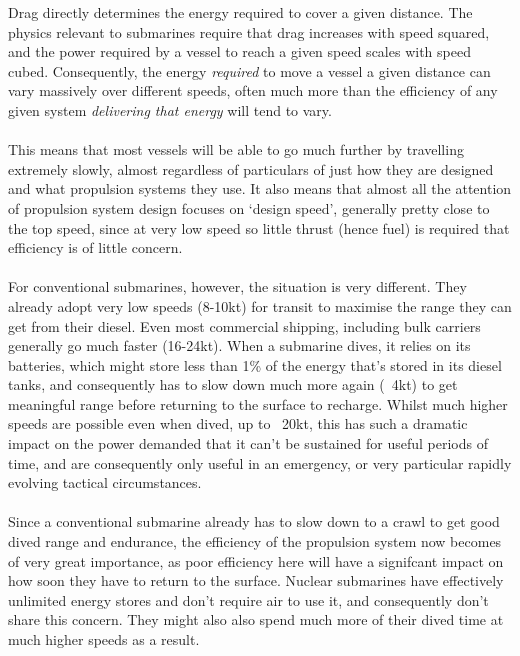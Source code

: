 \documentclass{article}\usepackage[]{graphicx}\usepackage[]{color}
\begin{document}
\begin{tcolorbox}[width=0.8\textwidth, center, colback=blue!5!white,colframe=blue!75!black, title= Quick Summary: Sped and Drag]
Drag directly determines the energy required to cover a given distance. The physics relevant to submarines require that drag increases with speed squared, and the power required by a vessel to reach a given speed scales with speed cubed.  Consequently, the energy \textit{required} to move a vessel a given distance can vary massively over different speeds, often much more than the efficiency of any given system \textit{delivering that energy} will tend to vary.
\\
\\
This means that most vessels will be able to go much further by travelling extremely slowly, almost regardless of particulars of just how they are designed and what propulsion systems they use.  It also means that almost all the attention of propulsion system design focuses on `design speed', generally pretty close to the top speed, since at very low speed so little thrust (hence fuel) is required that efficiency is of little concern.
\\
\\
For conventional submarines, however, the situation is very different.  They already adopt very low speeds (8-10kt) for transit to maximise the range they can get from their diesel.  Even most commercial shipping, including bulk carriers generally go much faster (16-24kt).  When a submarine dives, it relies on its batteries, which might store less than 1\% of the energy that's stored in its diesel tanks, and consequently has to slow down much more again (~4kt) to get meaningful range before returning to the surface to recharge. Whilst much higher speeds are possible even when dived, up to ~20kt, this has such a dramatic impact on the power demanded that it can't be sustained for useful periods of time, and are consequently only useful in an emergency, or very particular rapidly evolving tactical circumstances.
\\
\\
Since a conventional submarine already has to slow down to a crawl to get good dived range and endurance, the efficiency of the propulsion system now becomes of very great importance, as poor efficiency here will have a signifcant impact on how soon they have to return to the surface.  Nuclear submarines have effectively unlimited energy stores and don't require air to use it, and consequently don't share this concern.  They might also also spend much more of their dived time at much higher speeds as a result.
\end{tcolorbox}
\end{document}
